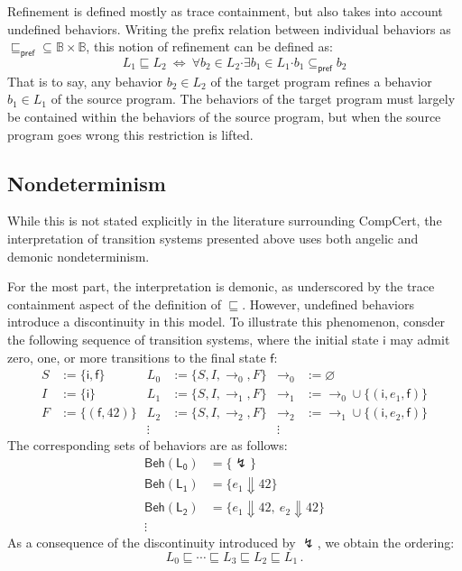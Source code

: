 \documentclass[11pt,oneside,draft]{book}
\theoremstyle{definition}
\newcommand{\kw}[1]{\ensuremath{ \mathsf{#1} }}
\newcommand{\bdot}{\boldsymbol{\cdot}}
\newcommand{\refby}{\sqsubseteq} %
\begin{document}
Refinement is defined mostly as trace containment,
but also takes into account undefined behaviors.
Writing the prefix relation between individual behaviors as
${\sqsubseteq_\kw{pref}} \subseteq \mathbb{B} \times \mathbb{B}$,
this notion of refinement can be defined as:
\[
  L_1 \refby L_2
  \: \Leftrightarrow \:
  \forall b_2 \in L_2 \bdot
  \exists b_1 \in L_1 \bdot
  b_1 \subseteq_\kw{pref} b_2
\]
That is to say,
any behavior $b_2 \in L_2$ of the target program
refines a behavior $b_1 \in L_1$ of the source program.
The behaviors of the target program must largely be contained
within the behaviors of the source program,
but when the source program goes wrong
this restriction is lifted.

\subsection{Nondeterminism}

While this is not stated explicitly
in the literature surrounding CompCert,
the interpretation of transition systems presented above
uses both angelic and demonic nondeterminism.

For the most part,
the interpretation is demonic,
as underscored by the trace containment aspect
of the definition of $\refby$.
However,
undefined behaviors introduce a discontinuity in this model.
To illustrate this phenomenon,
consder the following sequence of transition systems,
where the initial state $\kw{i}$ may admit zero, one, or more
transitions to the final state $\kw{f}$:
\begin{align*}
  S &:= \{ \kw{i}, \kw{f} \} &
  L_0 &:= \{ S, I, {\rightarrow_0}, F \} &
  {\rightarrow_0} &:= \varnothing \\
  I &:= \{ \kw{i} \} &
  L_1 &:= \{ S, I, {\rightarrow_1}, F \} &
  {\rightarrow_1} &:= {\rightarrow_0} \cup
    \{ (\kw{i}, e_1, \kw{f}) \} \\
  F &:= \{ (\kw{f}, 42) \} &
  L_2 &:= \{ S, I, {\rightarrow_2}, F \} & 
  {\rightarrow_2} &:= {\rightarrow_1} \cup
    \{ (\kw{i}, e_2, \kw{f}) \} \\
  & & \vdots \: & & \vdots \:\:
\end{align*}
The corresponding sets of behaviors are as follows:
\begin{align*}
  \kw{Beh(L_0)} &= \{ \lightning \} \\
  \kw{Beh(L_1)} &= \{ e_1 \Downarrow 42 \} \\
  \kw{Beh(L_2)} &= \{ e_1 \Downarrow 42, \: e_2 \Downarrow 42 \} \\
  \vdots \quad
\end{align*}
As a consequence of the discontinuity introduced by $\lightning$,
we obtain the ordering:
\[
  L_0 \refby \cdots \refby L_3 \refby L_2 \refby L_1
  \,.
\]
\end{document}
